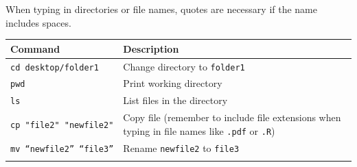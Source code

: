 \documentclass[]{book}
\begin{document}
When typing in directories or file names, quotes are necessary if the
name includes spaces.

\begin{longtable}[]{@{}ll@{}}
\toprule
\begin{minipage}[b]{0.14\columnwidth}\raggedright\strut
Command\strut
\end{minipage} & \begin{minipage}[b]{0.18\columnwidth}\raggedright\strut
Description\strut
\end{minipage}\tabularnewline
\midrule
\endhead
\begin{minipage}[t]{0.14\columnwidth}\raggedright\strut
\texttt{cd\ desktop/folder1}\strut
\end{minipage} & \begin{minipage}[t]{0.18\columnwidth}\raggedright\strut
Change directory to \texttt{folder1}\strut
\end{minipage}\tabularnewline
\begin{minipage}[t]{0.14\columnwidth}\raggedright\strut
\texttt{pwd}\strut
\end{minipage} & \begin{minipage}[t]{0.18\columnwidth}\raggedright\strut
Print working directory\strut
\end{minipage}\tabularnewline
\begin{minipage}[t]{0.14\columnwidth}\raggedright\strut
\texttt{ls}\strut
\end{minipage} & \begin{minipage}[t]{0.18\columnwidth}\raggedright\strut
List files in the directory\strut
\end{minipage}\tabularnewline
\begin{minipage}[t]{0.14\columnwidth}\raggedright\strut
\texttt{cp\ "file2"\ "newfile2"}\strut
\end{minipage} & \begin{minipage}[t]{0.18\columnwidth}\raggedright\strut
Copy file (remember to include file extensions when typing in file names
like \texttt{.pdf} or \texttt{.R})\strut
\end{minipage}\tabularnewline
\begin{minipage}[t]{0.14\columnwidth}\raggedright\strut
\texttt{mv\ “newfile2”\ “file3”}\strut
\end{minipage} & \begin{minipage}[t]{0.18\columnwidth}\raggedright\strut
Rename \texttt{newfile2} to \texttt{file3}\strut
\end{minipage}\tabularnewline
\begin{minipage}[t]{0.14\columnwidth}\raggedright\strut

\end{minipage}
\end{longtable}
\end{document}
